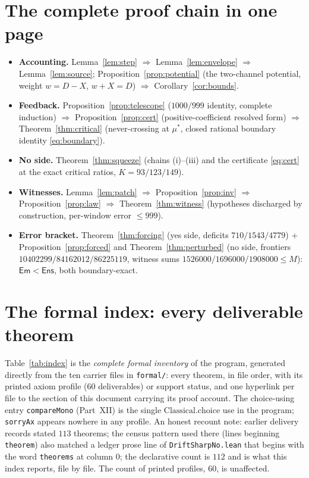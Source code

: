 \documentclass[11pt]{article}
\theoremstyle{plain}
\theoremstyle{definition}
\begin{document}
\appendix

\section{The complete proof chain in one page}\label{sec:chain}

\begin{itemize}
\item \textbf{Accounting.} Lemma~\ref{lem:step} $\Rightarrow$ Lemma~\ref{lem:envelope}
$\Rightarrow$ Lemma~\ref{lem:source}; Proposition~\ref{prop:potential} (the two-channel
potential, weight $w=D-X$, $w+X=D$) $\Rightarrow$ Corollary~\ref{cor:bounds}.
\item \textbf{Feedback.} Proposition~\ref{prop:telescope} ($1000/999$ identity, complete
induction) $\Rightarrow$ Proposition~\ref{prop:cert} (positive-coefficient resolved form)
$\Rightarrow$ Theorem~\ref{thm:critical} (never-crossing at $\mu^{\ast}$, closed rational
boundary identity \eqref{eq:boundary}).
\item \textbf{No side.} Theorem~\ref{thm:squeeze} (chains (i)--(iii) and the certificate
\eqref{eq:cert} at the exact critical ratios, $K=93/123/149$).
\item \textbf{Witnesses.} Lemma~\ref{lem:patch} $\Rightarrow$ Proposition~\ref{prop:inv}
$\Rightarrow$ Proposition~\ref{prop:law} $\Rightarrow$ Theorem~\ref{thm:witness}
(hypotheses discharged by construction, per-window error $\le 999$).
\item \textbf{Error bracket.} Theorem~\ref{thm:forcing} (yes side, deficits
$710/1543/4779$) $+$ Proposition~\ref{prop:forced} and Theorem~\ref{thm:perturbed}
(no side, frontiers $10402299/84162012/86225119$, witness sums
$1526000/1696000/1908000\le M$): $\mathsf{Em}<\mathsf{Ens}$, both boundary-exact.
\end{itemize}

\section{The formal index: every deliverable theorem}\label{sec:index}

Table~\ref{tab:index} is the \emph{complete formal inventory} of the program,
generated directly from the ten carrier files in \texttt{formal/}: every theorem,
in file order, with its printed axiom profile ($60$ deliverables) or support status,
and one hyperlink per file to the section of this document carrying its proof account.
The choice-using entry \texttt{compareMono} (Part~XII) is the single
$\mathrm{Classical.choice}$ use in the program; \texttt{sorryAx} appears nowhere in
any profile. An honest recount note: earlier delivery records stated $113$ theorems;
the census pattern used there (lines beginning \texttt{theorem}) also matched a
ledger prose line of \texttt{DriftSharpNo.lean} that begins with the word
\texttt{theorems} at column 0; the declarative count is $112$ and is what this
index reports, file by file. The count of printed profiles, $60$, is unaffected.
\end{document}

